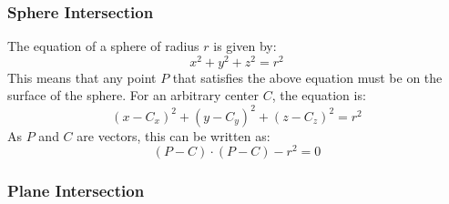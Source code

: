 \documentclass{article}
\begin{document}
        \subsubsection{Sphere Intersection}
            The equation of a sphere of radius $r$ is given by:
            \begin{equation*}
                x^2 + y^2 + z^2 = r^2
            \end{equation*}
            This means that any point $P$ that satisfies the above equation must be on the surface
            of the sphere. For an arbitrary center $C$, the equation is:
            \begin{equation*}
                (x - C_x)^2 + (y - C_y)^2 + (z - C_z)^2 = r^2
            \end{equation*}
            As $P$ and $C$ are vectors, this can be written as:
            \begin{equation*}
                (P - C) \cdot (P - C) - r^2 = 0
            \end{equation*}

        \subsubsection{Plane Intersection}
\end{document}
